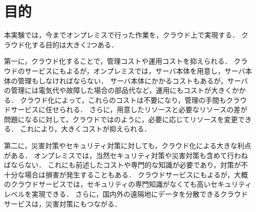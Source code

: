 \section{目的}
本実験では，今までオンプレミスで行った作業を，クラウド上で実現する．
クラウド化する目的は大きく2つある．\par
第一に，クラウド化することで，管理コストや運用コストを抑えられる．
クラウドのサービスにもよるが，オンプレミスでは，サーバ本体を用意し，サーバ本体の管理もしなければならない．
サーバ本体にかかるコストもあるが，サーバの管理には電気代や故障した場合の部品代など，運用にもコストが大きくかかる．
クラウド化によって，これらのコストは不要になり，管理の手間もクラウドサービスに任せられる．
さらに，用意したリソースと必要なリソースの差が問題になるに対して，クラウドではのように，必要に応じてリソースを変更できる．
これにより，大きくコストが抑えられる\cite{2015amazon}．\par
第二に，災害対策やセキュリティ対策に対しても，クラウド化による大きな利点がある．
オンプレミスでは，当然セキュリティ対策や災害対策も含めて行わねばならない．
これにも前述したコストや専門的な知識が必要であり，対策が不十分な場合は損害が発生することもある．
クラウドサービスにもよるが，大概のクラウドサービスでは，セキュリティの専門知識がなくても高いセキュリティレベルを実現できる．
さらに，国内外の遠隔地にデータを分散できるクラウドサービスは，災害対策にもつながる．\par
